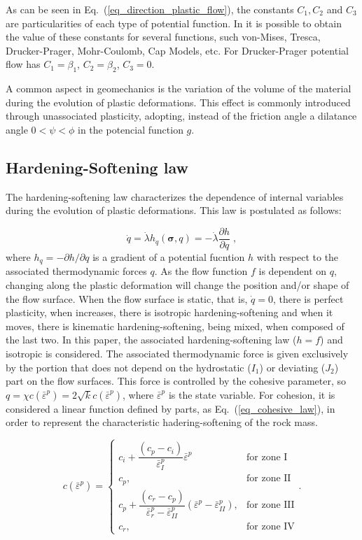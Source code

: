 \documentclass[Journal,letterpaper]{ascelike-new}
\newcommand{\hl}{{h_q}}
\newcommand{\strainpeq}{\bar \varepsilon^p}
\newcommand{\stress}{\boldsymbol{\sigma}}
\begin{document}
As can be seen in Eq.~(\ref{eq_direction_plastic_flow}), the constants $C_1, C_2$ and $C_3$ are particularities of each type of potential function. In  it is possible to obtain the value of these constants for several functions, such von-Mises, Tresca, Drucker-Prager, Mohr-Coulomb, Cap Models, etc. For Drucker-Prager potential flow has $C_1 = \beta_1$, $C_2 = \beta_2$, $C_3 = 0$.

A common aspect in geomechanics is the variation of the volume of the material during the evolution of plastic deformations. This effect is commonly introduced through unassociated plasticity, adopting, instead of the friction angle a dilatance angle $0<\psi<\phi$ in the potencial function $g$.

\subsection{Hardening-Softening law}

The hardening-softening law characterizes the dependence of internal variables during the evolution of plastic deformations. This law is postulated as follows:

\begin{equation} \label{eq_hardening_law}
	\dot q = \dot \lambda \hl(\stress,q) = - \dot \lambda \dfrac{\partial h}{\partial q}\;,
\end{equation}
where $\hl = -\partial h / \partial q$ is a gradient of a potential fucntion $h$ with respect to the associated thermodynamic forces $q$. As the flow function $f$ is dependent on $q$, changing along the plastic deformation will change the position and/or shape of the flow surface. When the flow surface is static, that is, $\dot q = 0$, there is perfect plasticity, when increases, there is isotropic hardening-softening and when it moves, there is kinematic hardening-softening, being mixed, when composed of the last two. In this paper, the associated hardening-softening law ($h=f$) and isotropic is considered. The associated thermodynamic force is given exclusively by the portion that does not depend on the hydrostatic ($I_1$) or deviating ($J_2$) part on the flow surfaces. This force is controlled by the cohesive parameter, so $q = \chi c(\strainpeq) = 2\sqrt{k}c(\strainpeq)$, where $\strainpeq$ is the state variable. For cohesion, it is considered a linear function defined by parts, as Eq.~(\ref{eq_cohesive_law}), in order to represent the characteristic hadering-softening of the rock mass.

\begin{equation} \label{eq_cohesive_law}
c (\bar \varepsilon^p) = \left\{ 
\begin{array}{ll} 
	c_i + \dfrac{(c_p-c_i)}{\bar \varepsilon^p_I}\bar \varepsilon^p &  \text{for zone I} \\ 
	c_p, & \text{for zone II} \\
	c_p + \dfrac{(c_r-c_p)}{\bar \varepsilon^p_r-\bar \varepsilon^p_{II}}(\bar \varepsilon^p - \bar \varepsilon^p_{II}), & \text{for zone III} \\	
	c_r, & \text{for zone IV}
\end{array}\right..
\end{equation}
\end{document}
